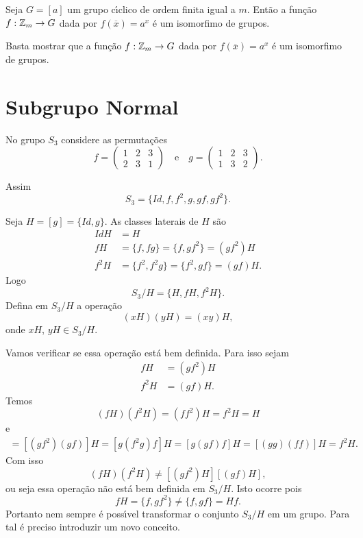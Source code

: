 \begin{corolario}
    Seja $G = [a]$ um grupo c{\'\i}clico de ordem finita igual a $m$. Ent\~ao a fun\c{c}\~ao $f : \mathbb{Z}_m \to G$ dada por $f(\overline{x}) = a^x$ \'e um isomorfimo de grupos.
\end{corolario}
\begin{prova}
    Basta mostrar que a fun\c{c}\~ao $f : \mathbb{Z}_m \to G$ dada por $f(\overline{x}) = a^x$ \'e um isomorfimo de grupos.
\end{prova}

\section{Subgrupo Normal} %
\label{sec:subgrupo_normal}

No grupo $S_3$ considere as permuta\c{c}\~oes
\[
    f = \begin{pmatrix}
        1 & 2 & 3\\
        2 & 3 & 1
    \end{pmatrix} \quad \mbox{e}\quad
    g = \begin{pmatrix}
        1 & 2 & 3\\
        1 & 3 & 2
    \end{pmatrix}.
\]

Assim
\[
    S_3 = \{Id, f, f^2, g, gf, gf^2\}.
\]

Seja $H = [g] = \{Id, g\}$. As classes laterais de $H$ s\~ao
\begin{align*}
    IdH &= H\\
    fH &= \{f, fg\} = \{f, gf^2\} = (gf^2)H\\
    f^2H &= \{f^2, f^2g\} = \{f^2, gf\} = (gf)H.
\end{align*}
Logo
\[
    S_3/H = \{H, fH, f^2H\}.
\]
Defina em $S_3/H$ a opera\c{c}\~ao
\[
    (xH)(yH) = (xy)H,
\]
onde $xH$, $yH \in S_3/H$.

Vamos verificar se essa opera\c{c}\~ao est\'a bem definida. Para isso sejam
\begin{align*}
    fH &= (gf^2)H\\
    f^2H &= (gf)H.
\end{align*}
Temos
\[
    (fH)(f^2H) = (ff^2)H = f^2H = H
\]
e
\begin{align*}
    [(gf^2)H][(gf)H] = [(gf^2)(gf)]H = [g(f^2g)f]H = [g(gf)f]H = [(gg)(ff)]H = f^2H.
\end{align*}
Com isso
\[
    (fH)(f^2H) \ne [(gf^2)H][(gf)H],
\]
ou seja essa opera\c{c}\~ao n\~ao est\'a bem definida em $S_3/H$. Isto ocorre pois
\[
    fH = \{f, gf^2\} \ne \{f, gf\} = Hf.
\]
Portanto nem sempre \'e poss{\'\i}vel transformar o conjunto $S_3/H$ em um grupo. Para tal \'e preciso introduzir um novo conceito.

